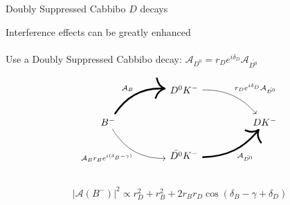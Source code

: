 \documentclass[dvipsnames]{beamer}
\begin{document}
\begin{frame}[fragile]{Doubly Suppressed Cabbibo $D$ decays}
  \begin{center}
    Interference effects can be greatly enhanced\\~\\
    Use a Doubly Suppressed Cabbibo decay: $\mathcal{A}_{D^0} = r_De^{i\delta_D}\mathcal{A}_{\bar{D^0}}$
  \end{center}
  \begin{equation*}
    \begin{tikzcd}[column sep=huge]
      & D^0K^- \arrow[dr, bend left = 25, "r_De^{i\delta_D}\mathcal{A}_{\bar{D^0}}"] & \\
      B^- \arrow[ur, bend left, line width = 1.7, "\mathcal{A}_B"] \arrow[dr, bend right, "\mathcal{A}_B r_B e^{i(\delta_B - \gamma)}"'] & [5cm] & DK^- \\
      & \bar{D^0}K^- \arrow[ur, bend right = 25, line width = 1.7, "\mathcal{A}_{\bar{D^0}}"'] & \\
    \end{tikzcd}
  \end{equation*}
  \begin{equation*}
    \lvert\mathcal{A}(B^-)\lvert^2\propto r_D^2 + r_B^2 + 2r_Br_D\cos(\delta_B - \gamma + \delta_D)
  \end{equation*}
\end{frame}
\end{document}

